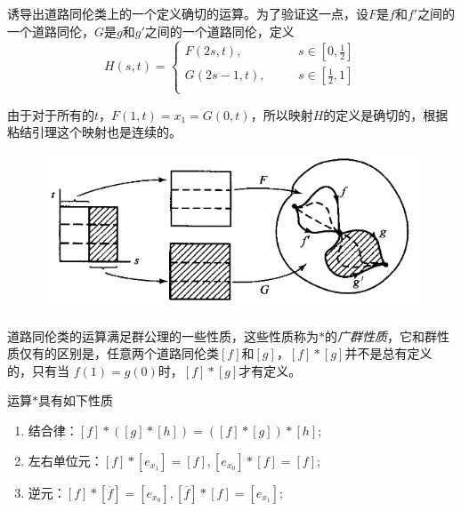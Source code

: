 诱导出道路同伦类上的一个定义确切的运算。为了验证这一点，设$F$是$f$和$f'$之间的一个道路同伦，$G$是$g$和$g'$之间的一个道路同伦，定义
\begin{equation}
    H(s,t)=\left\{
        \begin{array}{lll}
            F(2s,t),  & \hspace{1em} & s\in [0,\frac{1}{2}]\\
            G(2s-1,t), & \hspace{1em} & s\in [\frac{1}{2},1]\\
        \end{array}
    \right.
\end{equation}

由于对于所有的$t$，$F(1,t)=x_1=G(0,t)$，所以映射$H$的定义是确切的，根据粘结引理这个映射也是连续的。
\begin{figure}[H]
    \centering
    \includegraphics[scale=0.4]{figures/道路同伦类.png}
    \caption{}
\end{figure}

道路同伦类的运算满足群公理的一些性质，这些性质称为$*$的\textsl{广群性质}，它和群性质仅有的区别是，任意两个道路同伦类$[f]$和$[g]$，$[f]*[g]$并不是总有定义的，只有当
$f(1)=g(0)$时，$[f]*[g]$才有定义。

\begin{mdframed}
    \begin{theorem}
        运算$*$具有如下性质
        \begin{enumerate}[itemindent=2em]
            \item 结合律：$[f]*([g]*[h])=([f]*[g])*[h]$;
            \item 左右单位元：$[f]*[e_{x_1}]=[f],[e_{x_0}]*[f]=[f]$;
            \item 逆元：$[f]*[\overline{f}]=[e_{x_0}],[\overline{f}]*[f]=[e_{x_1}]$;
        \end{enumerate}
    \end{theorem}
\end{mdframed}

